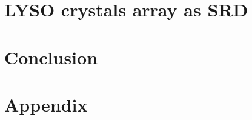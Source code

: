 \chapter{LYSO crystals array as SRD}



\chapter{Conclusion}



\appendix
\chapter{Appendix}



\cleardoublepage





